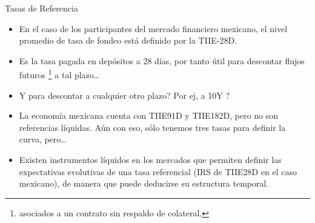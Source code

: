\documentclass[11pt]{beamer}
\begin{document}
\begin{frame}{Tasas de Referencia}
	\begin{itemize}
		
	
	\item En el caso de los participantes del mercado financiero mexicano, el nivel promedio de tasa de fondeo está definido por la TIIE-28D.
	
	\item Es la tasa pagada en depósitos a 28 días, por tanto útil para descontar flujos futuros \footnote{asociados a un contrato sin respaldo de colateral.} a tal plazo…
	
\item 	Y para descontar a cualquier otro plazo? Por ej, a 10Y ?
	
	\item La economía mexicana cuenta con TIIE91D y TIIE182D, pero no son referencias líquidas. Aún con eso, sólo tenemos tres tasas para definir la curva, pero…
	
	\item Existen instrumentos líquidos en los mercados que permiten definir las expectativas evolutivas de una tasa referencial (IRS de TIIE28D en el caso mexicano), de manera que puede deducirse su estructura temporal.
	
\end{itemize}
\end{frame}
\end{document}
